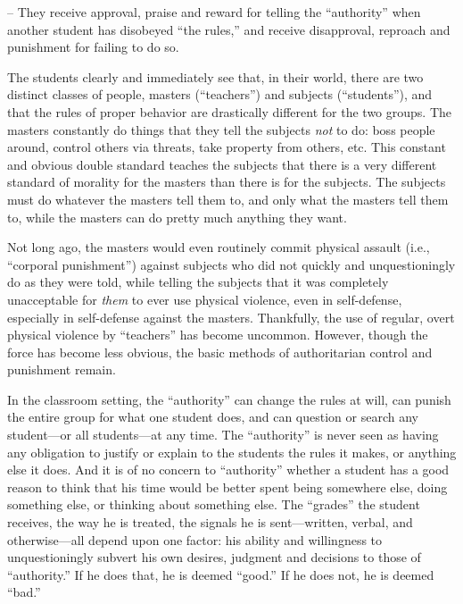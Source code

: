 \documentclass{book}
\begin{document}
-- They receive approval, praise and reward for telling the \enquote{authority} when another student has disobeyed \enquote{the rules,} and receive disapproval, reproach and punishment for failing to do so.

The students clearly and immediately see that, in their world, there are two distinct classes of people, masters (\enquote{teachers}) and subjects (\enquote{students}), and that the rules of proper behavior are drastically different for the two groups. The masters constantly do things that they tell the subjects \emph{not} to do: boss people around, control others via threats, take property from others, etc. This constant and obvious double standard teaches the subjects that there is a very different standard of morality for the masters than there is for the subjects. The subjects must do whatever the masters tell them to, and only what the masters tell them to, while the masters can do pretty much anything they want.

Not long ago, the masters would even routinely commit physical assault (i.e., \enquote{corporal punishment}) against subjects who did not quickly and unquestioningly do as they were told, while telling the subjects that it was completely unacceptable for \emph{them} to ever use physical violence, even in self-defense, especially in self-defense against the masters. Thankfully, the use of regular, overt physical violence by \enquote{teachers} has become uncommon. However, though the force has become less obvious, the basic methods of authoritarian control and punishment remain.

In the classroom setting, the \enquote{authority} can change the rules at will, can punish the entire group for what one student does, and can question or search any student---or all students---at any time. The \enquote{authority} is never seen as having any obligation to justify or explain to the students the rules it makes, or anything else it does. And it is of no concern to \enquote{authority} whether a student has a good reason to think that his time would be better spent being somewhere else, doing something else, or thinking about something else. The \enquote{grades} the student receives, the way he is treated, the signals he is sent---written, verbal, and otherwise---all depend upon one factor: his ability and willingness to unquestioningly subvert his own desires, judgment and decisions to those of \enquote{authority.} If he does that, he is deemed \enquote{good.} If he does not, he is deemed \enquote{bad.}
\end{document}

